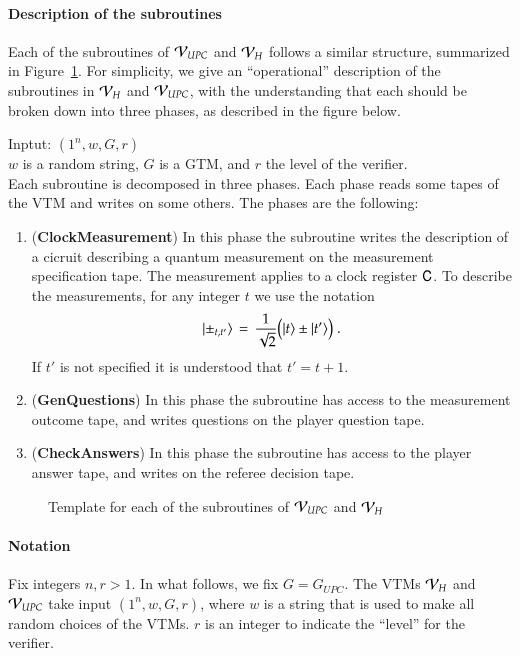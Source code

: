 \paragraph{Description of the subroutines}

Each of the subroutines of $\mathcal V_{UPC}$ and $\mathcal V_H$ follows a similar structure, summarized in Figure~\ref{fig:check_structure}. For simplicity, we give an ``operational'' description of the subroutines in $\mathcal V_H$ and $\mathcal V_{UPC}$, with the understanding that each should be broken down into three phases, as described in the figure below.

\vspace{10pt}
\begin{center}
\begin{mdframed}
Inptut: $(1^n,w,G,r)$\\
  $w$ is a random string, $G$ is a GTM, and $r$ the level of the verifier.\\
Each subroutine is decomposed in three phases. Each phase reads some tapes of the VTM and writes on some others. The phases are the following: 
	\begin{enumerate}
		\item (\textbf{ClockMeasurement}) In this phase the subroutine writes the description of a cicruit describing a quantum measurement on the measurement specification tape. The measurement applies to a clock register ${\mathsf{C}}$. To describe the measurements, for any integer $t$ we use the notation 
$$|\pm_{t,t'}\rangle \,=\, \frac{1}{\sqrt{2}}\big(|t\rangle\pm|t'\rangle\big)\;.$$
If $t'$ is not specified it is understood that $t'=t+1$.
	\item (\textbf{GenQuestions}) In this phase the subroutine has access to the measurement outcome tape, and writes questions on the player question tape. 
	\item (\textbf{CheckAnswers}) In this phase the subroutine has access to the player answer tape, and writes on the referee decision tape. 
	\end{enumerate}    
\end{mdframed}

\end{center}
\begin{figure}[H]
\caption{Template for each of the subroutines of $\mathcal V_{UPC}$ and $\mathcal V_H$}
\label{fig:check_structure}
\end{figure}

\paragraph{Notation} 
Fix integers $n, r > 1$. In what follows, we fix $G = G_{UPC}$. The VTMs $\mathcal V_H$ and $\mathcal V_{UPC}$ take input $(1^n,w,G,r)$, where $w$ is a string that is used to make all random choices of the VTMs. $r$ is an integer to indicate the ``level'' for the verifier. 


